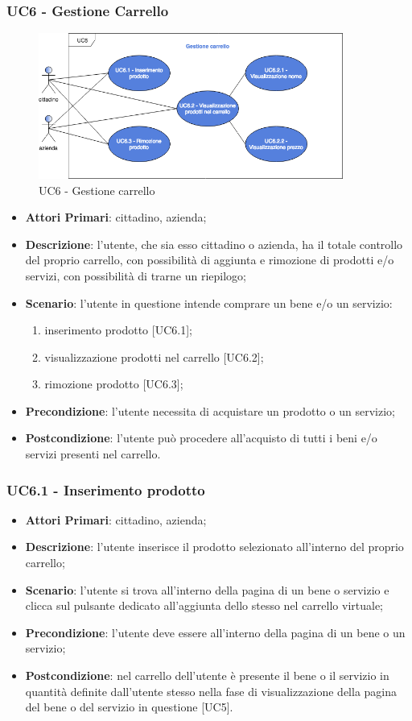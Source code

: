 \subsubsection{UC6 - Gestione Carrello}
 \begin{figure}[h]
	\includegraphics[width=10cm]{res/images/UC6GestioneCarrello.png}
	\centering
	\caption{UC6 - Gestione carrello}
\end{figure}
\begin{itemize}
	\item \textbf{Attori Primari}: cittadino, azienda\glo;
	\item \textbf{Descrizione}: l'utente, che sia esso cittadino o azienda, ha il totale controllo del proprio carrello, con possibilità di aggiunta e rimozione di prodotti e/o servizi, con possibilità di trarne un riepilogo;
	\item \textbf{Scenario}: l'utente in questione intende comprare un bene e/o un servizio:
	 \begin{enumerate}[label=\alph*.]
		\item inserimento prodotto [UC6.1];
		\item visualizzazione prodotti nel carrello [UC6.2];
		\item rimozione prodotto [UC6.3];
	\end{enumerate}
	\item \textbf{Precondizione}: l'utente necessita di acquistare un prodotto o un servizio;
	\item \textbf{Postcondizione}: l'utente può procedere all'acquisto di tutti i beni e/o servizi presenti nel carrello.
\end{itemize} 
 \subsubsection{UC6.1 - Inserimento prodotto}
\begin{itemize}
	\item \textbf{Attori Primari}: cittadino, azienda\glo;
	\item \textbf{Descrizione}: l'utente inserisce il prodotto selezionato all'interno del proprio carrello;
	\item \textbf{Scenario}: l'utente si trova all'interno della pagina di un bene o servizio e clicca sul pulsante dedicato all'aggiunta dello stesso nel carrello virtuale;
	\item \textbf{Precondizione}: l'utente deve essere all'interno della pagina di un bene o un servizio;
	\item \textbf{Postcondizione}: nel carrello dell'utente è presente il bene o il servizio in quantità definite dall'utente stesso nella fase di visualizzazione della pagina del bene o del servizio in questione [UC5].
\end{itemize}
